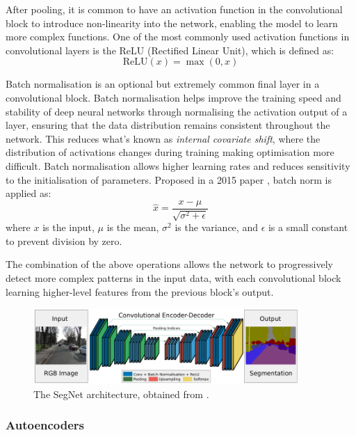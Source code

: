 After pooling, it is common to have an activation function in the convolutional block to introduce non-linearity into the network, enabling the model to learn more complex functions. One of the most commonly used activation functions in convolutional layers is the ReLU (Rectified Linear Unit), which is defined as:
\begin{equation}
    \text{ReLU}(x) = \max(0, x)
\end{equation}

Batch normalisation is an optional but extremely common final layer in a convolutional block. Batch normalisation helps improve the training speed and stability of deep neural networks through normalising the activation output of a layer, ensuring that the data distribution remains consistent throughout the network. This reduces what's known as \textit{internal covariate shift}, where the distribution of activations changes during training making optimisation more difficult. Batch normalisation allows higher learning rates and reduces sensitivity to the initialisation of parameters. Proposed in a 2015 paper \cite{ioffe_batch_2015}, batch norm is applied as:
\begin{equation}
    \hat{x} = \frac{x - \mu}{\sqrt{\sigma^2 + \epsilon}}
\end{equation}
where $x$ is the input, $\mu$ is the mean, $\sigma^2$ is the variance, and $\epsilon$ is a small constant to prevent division by zero. 

The combination of the above operations allows the network to progressively detect more complex patterns in the input data, with each convolutional block learning higher-level features from the previous block's output. 

\begin{figure}[t]
    \centering
    \includegraphics[width=0.9\textwidth]{img/ch1/segnet.png}
    \caption{The SegNet architecture, obtained from \cite{badrinarayanan_segnet_2015}.}
    \label{fig:segnet}
\end{figure}

\subsubsection{Autoencoders}

